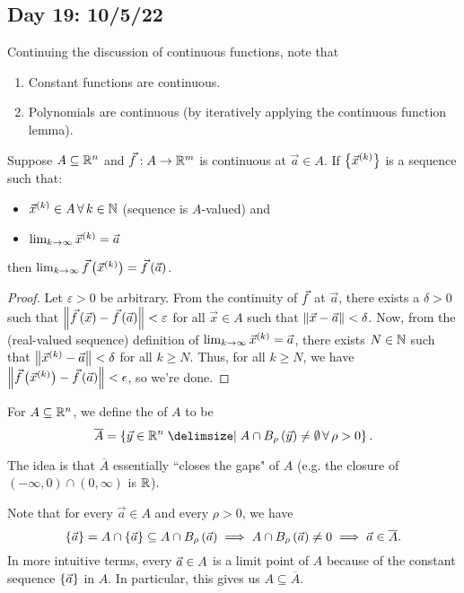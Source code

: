 \documentclass[main.tex]{subfiles}
\begin{document}
\subsection{Day 19: 10/5/22}

Continuing the discussion of continuous functions, note that
\begin{enumerate}
    \item Constant functions are continuous.
    \item Polynomials are continuous (by iteratively applying the continuous function lemma).
\end{enumerate}

\begin{proposition}
    Suppose $A\subseteq \mathbb R^n$ and $\vec{f} : A\to \mathbb R^m$ is continuous at $\vec{a}\in A$. If $\left\{ \vec{x}^{(k)} \right\}$ is a sequence such that:
    \begin{itemize}
        \item $\vec{x}^{(k)} \in A \,\forall\, k\in \mathbb N$ (sequence is $A$-valued) and
        \item $\lim_{k\to \infty} \vec{x}^{(k)} = \vec{a}$
    \end{itemize}
    then $\lim_{k\to \infty} \vec{f}\left( \vec{x}^{(k)} \right) = \vec{f}\left( \vec{a} \right)$.
\end{proposition}

\begin{proof}
    Let $\varepsilon > 0$ be arbitrary. From the continuity of $\vec{f}$ at $\vec{a}$, there exists a $\delta > 0$ such that $\left\lVert \vec{f}\left( \vec{x} \right) - \vec{f}\left( \vec{a} \right) \right\rVert < \varepsilon$ for all $\vec{x}\in A$ such that $\left\lVert \vec{x} - \vec{a} \right\rVert < \delta$. Now, from the (real-valued sequence) definition of $\lim_{k\to \infty} \vec{x}^{(k)} = \vec{a}$, there exists $N\in \mathbb N$ such that $\left\lVert \vec{x}^{(k)} - \vec{a} \right\rVert < \delta$ for all $k\ge N$. Thus, for all $k\ge N$, we have $\left\lVert \vec{f}\left( \vec{x}^{(k)} \right) - \vec{f}\left( \vec{a} \right) \right\rVert < \epsilon$, so we're done.
\end{proof}

\begin{definition}[Closure]
    For $A\subseteq \mathbb R^n$, we define the  of $A$ to be
    \[\overline{A} = \braces{\vec{y}\in \RR^n \mid A\cap B_\rho\parens{\vec{y}} \neq \emptyset \,\forall\, \rho > 0}.\]
\end{definition}

The idea is that $\overline{A}$ essentially ``closes the gaps" of $A$ (e.g. the closure of $(-\infty, 0)\cap (0, \infty)$ is $\mathbb R$).
\begin{remark}
    Note that for every $\vec{a}\in A$ and every $\rho > 0$, we have \[\left\{ \vec{a} \right\} = A\cap \left\{ \vec{a} \right\}\subseteq A\cap B_\rho\left( \vec{a} \right) \implies A\cap B_\rho\left( \vec{a} \right) \neq 0\implies \vec{a}\in\overline{A}.\]
    In more intuitive terms, every $\vec{a}\in A$ is a limit point of $A$ because of the constant sequence $\{\vec{a}\}$ in $A$. In particular, this gives us $A\subseteq \overline{A}$.
\end{remark}
\end{document}
